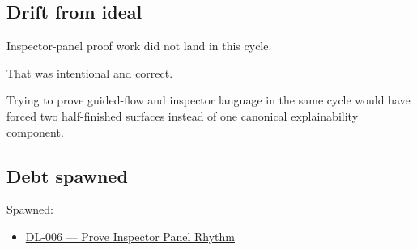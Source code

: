 \subsection{Drift from ideal}\label{record-172-drift-from-ideal}

Inspector-panel proof work did not land in this cycle.

That was intentional and correct.

Trying to prove guided-flow and inspector language in the same cycle would have forced two half-finished surfaces instead of one canonical explainability component.

\subsection{Debt spawned}\label{record-172-debt-spawned}

Spawned:

\begin{itemize}
\tightlist
\item
  \href{https://github.com/flyingrobots/bijou/blob/cbd70612140e7a450d764b3c7be1c6af878b99bc/docs/method/graveyard/legacy-backlog/DL-006-prove-inspector-panel-rhythm.md}{DL-006 --- Prove Inspector Panel Rhythm}
\end{itemize}

